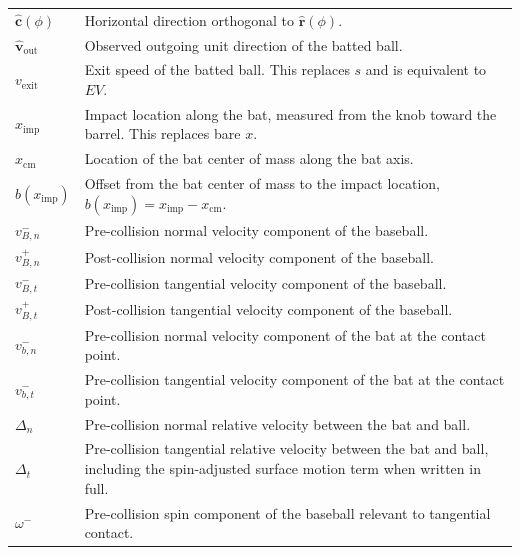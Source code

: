 \documentclass[11pt]{article}
\begin{document}
\begin{scriptsize}
\begin{longtable}{>{\raggedright\arraybackslash}p{}
                  >{\raggedright\arraybackslash}p{}}
\(\hat{\mathbf{c}}(\phi)\) 
& Horizontal direction orthogonal to \(\hat{\mathbf{r}}(\phi)\). \\

\(\hat{\mathbf{v}}_{\mathrm{out}}\) 
& Observed outgoing unit direction of the batted ball. \\

\(v_{\mathrm{exit}}\) 
& Exit speed of the batted ball. This replaces \(s\) and is equivalent to \(EV\). \\

\(x_{\mathrm{imp}}\) 
& Impact location along the bat, measured from the knob toward the barrel. This replaces bare \(x\). \\

\(x_{\mathrm{cm}}\) 
& Location of the bat center of mass along the bat axis. \\

\(b(x_{\mathrm{imp}})\) 
& Offset from the bat center of mass to the impact location, \(b(x_{\mathrm{imp}})=x_{\mathrm{imp}}-x_{\mathrm{cm}}\). \\

\(v_{B,n}^{-}\) 
& Pre-collision normal velocity component of the baseball. \\

\(v_{B,n}^{+}\) 
& Post-collision normal velocity component of the baseball. \\

\(v_{B,t}^{-}\) 
& Pre-collision tangential velocity component of the baseball. \\

\(v_{B,t}^{+}\) 
& Post-collision tangential velocity component of the baseball. \\

\(v_{b,n}^{-}\) 
& Pre-collision normal velocity component of the bat at the contact point. \\

\(v_{b,t}^{-}\) 
& Pre-collision tangential velocity component of the bat at the contact point. \\

\(\Delta_n\) 
& Pre-collision normal relative velocity between the bat and ball. \\

\(\Delta_t\) 
& Pre-collision tangential relative velocity between the bat and ball, including the spin-adjusted surface motion term when written in full. \\

\(\omega^{-}\) 
& Pre-collision spin component of the baseball relevant to tangential contact. \\


\end{longtable}
\end{scriptsize}
\end{document}
